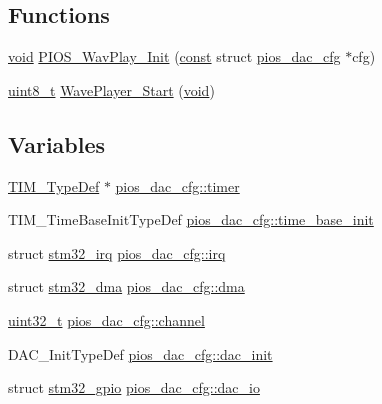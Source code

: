\subsection*{Functions}
\begin{DoxyCompactItemize}
\item 
\hyperlink{group___n_a_m_e_ga18028b8badbf1ea7e704ccac3c488e82}{void} \hyperlink{group___p_i_o_s___w_a_v_p_l_a_y_ga833570d033bad7d2098b024caec552be}{P\-I\-O\-S\-\_\-\-Wav\-Play\-\_\-\-Init} (\hyperlink{group___n_a_m_e_ga7ae6d0e43244213b34de2c2b9aa30da6}{const} struct \hyperlink{structpios__dac__cfg}{pios\-\_\-dac\-\_\-cfg} $\ast$cfg)
\item 
\hyperlink{stdint_8h_aba7bc1797add20fe3efdf37ced1182c5}{uint8\-\_\-t} \hyperlink{group___p_i_o_s___w_a_v_p_l_a_y_gad653a67ad3415d1d9d9c91e13904fb06}{Wave\-Player\-\_\-\-Start} (\hyperlink{group___n_a_m_e_ga18028b8badbf1ea7e704ccac3c488e82}{void})
\end{DoxyCompactItemize}
\subsection*{Variables}
\begin{DoxyCompactItemize}
\item 
\hyperlink{struct_t_i_m___type_def}{T\-I\-M\-\_\-\-Type\-Def} $\ast$ \hyperlink{group___p_i_o_s___w_a_v_p_l_a_y_ga06b2a838489fd6bb8f48615002e024d8}{pios\-\_\-dac\-\_\-cfg\-::timer}
\item 
T\-I\-M\-\_\-\-Time\-Base\-Init\-Type\-Def \hyperlink{group___p_i_o_s___w_a_v_p_l_a_y_ga1568b0926bb1e178d06682a8495e0f40}{pios\-\_\-dac\-\_\-cfg\-::time\-\_\-base\-\_\-init}
\item 
struct \hyperlink{structstm32__irq}{stm32\-\_\-irq} \hyperlink{group___p_i_o_s___w_a_v_p_l_a_y_ga1db4430fc674d954d396ce5abf14307c}{pios\-\_\-dac\-\_\-cfg\-::irq}
\item 
struct \hyperlink{structstm32__dma}{stm32\-\_\-dma} \hyperlink{group___p_i_o_s___w_a_v_p_l_a_y_ga9794db8fe6627bb998ba905f5ec5b869}{pios\-\_\-dac\-\_\-cfg\-::dma}
\item 
\hyperlink{stdint_8h_a435d1572bf3f880d55459d9805097f62}{uint32\-\_\-t} \hyperlink{group___p_i_o_s___w_a_v_p_l_a_y_ga197e2e3664b092f223251af8db017392}{pios\-\_\-dac\-\_\-cfg\-::channel}
\item 
D\-A\-C\-\_\-\-Init\-Type\-Def \hyperlink{group___p_i_o_s___w_a_v_p_l_a_y_ga2da6286f80191750fd6960a67d4a1e20}{pios\-\_\-dac\-\_\-cfg\-::dac\-\_\-init}
\item 
struct \hyperlink{structstm32__gpio}{stm32\-\_\-gpio} \hyperlink{group___p_i_o_s___w_a_v_p_l_a_y_gae02d1c0fa0764b2cf3172a8d3582295f}{pios\-\_\-dac\-\_\-cfg\-::dac\-\_\-io}
\end{DoxyCompactItemize}


